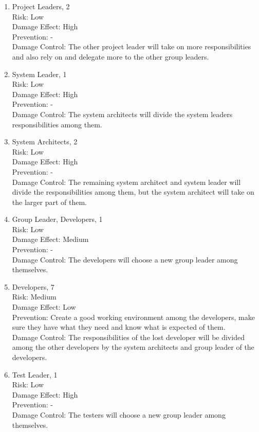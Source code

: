 \documentclass[a4paper]{article}
\begin{document}
\begin{enumerate}
\item Project Leaders, 2\\
Risk: Low\\
Damage Effect: High\\
Prevention: -\\
Damage Control: The other project leader will take on more responsibilities and also rely on and delegate more to the other group leaders.

\item System Leader, 1\\
Risk: Low\\
Damage Effect: High\\
Prevention: -\\
Damage Control: The system architects will divide the system leaders responsibilities among them.

\item System Architects, 2\\
Risk: Low\\
Damage Effect: High\\
Prevention: -\\
Damage Control: The remaining system architect and system leader will divide the responsibilities among them, but the system architect will take on the larger part of them.

\item Group Leader, Developers, 1\\
Risk: Low\\
Damage Effect: Medium\\
Prevention: -\\
Damage Control: The developers will choose a new group leader among themselves.

\item Developers, 7\\
Risk: Medium\\
Damage Effect: Low\\
Prevention: Create a good working environment among the developers, make sure they have what they need and know what is expected of them.\\
Damage Control: The responsibilities of the lost developer will be divided among the other developers by the system architects and group leader of the developers.

\item Test Leader, 1\\
Risk: Low\\
Damage Effect: High\\
Prevention: -\\
Damage Control: The testers will choose a new group leader among themselves.


\end{enumerate}
\end{document}
